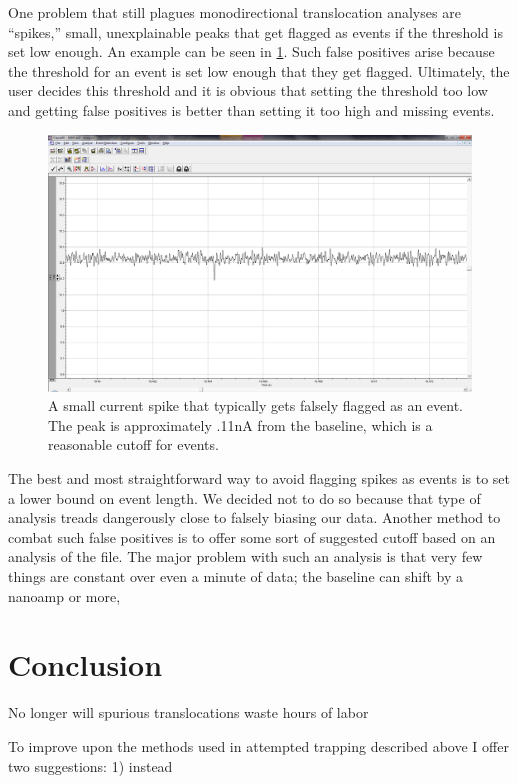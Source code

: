 \documentclass[aps,prl,preprint,groupedaddress]{revtex4}
\begin{document}
One problem that still plagues monodirectional translocation analyses are ``spikes,'' small, unexplainable peaks that get flagged as events if the threshold is set low enough.
An example can be seen in \ref{fig:spike}.
Such false positives arise because the threshold for an event is set low enough that they get flagged.
Ultimately, the user decides this threshold and it is obvious that setting the threshold too low and getting false positives is better than setting it too high and missing events.
\begin{figure}
\centering
\includegraphics[width=1\textwidth]{figures/false-positive-example}
\caption{A small current spike that typically gets falsely flagged as an event.
The peak is approximately .11nA from the baseline, which is a reasonable cutoff for events.}
\label{fig:spike}
\end{figure}
The best and most straightforward way to avoid flagging spikes as events is to set a lower bound on event length.
We decided not to do so because that type of analysis treads dangerously close to falsely biasing our data.
Another method to combat such false positives is to offer some sort of suggested cutoff based on an analysis of the file.
The major problem with such an analysis is that very few things are constant over even a minute of data; the baseline can shift by a nanoamp or more, 


\section{Conclusion}

No longer will spurious translocations waste hours of labor

To improve upon the methods used in attempted trapping described above I offer two suggestions:
1) instead
\end{document}
